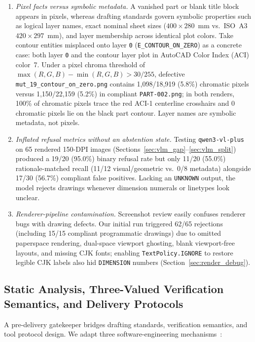 \documentclass[nocopyright,nolists,upint,varvw,hyphenate]{asmejour}
\begin{document}
\begin{enumerate}
\item \emph{Pixel facts versus symbolic metadata.} A vanished part or blank title block appears in pixels, whereas drafting standards govern symbolic properties such as logical layer names, exact nominal sheet sizes ($400 \times 280$~mm vs.\ ISO~A3 $420 \times 297$~mm), and layer membership across identical plot colors. Take contour entities misplaced onto layer \texttt{0} (\texttt{E\_CONTOUR\_ON\_ZERO}) as a concrete case: both layer \texttt{0} and the contour layer plot in AutoCAD Color Index (ACI) color~7. Under a pixel chroma threshold of $\max(R,G,B) - \min(R,G,B) > 30/255$, defective \texttt{mut\_19\_contour\_on\_zero.png} contains 1,098/18,919 (5.8\%) chromatic pixels versus 1,150/22,159 (5.2\%) in compliant \texttt{PART-002.png}; in both renders, 100\% of chromatic pixels trace the red ACI-1 centerline crosshairs and 0 chromatic pixels lie on the black part contour. Layer names are symbolic metadata, not pixels.

\item \emph{Inflated refusal metrics without an abstention state.} Testing \texttt{qwen3-vl-plus} on 65 rendered 150-DPI images (Sections~\ref{sec:vlm_gap}--\ref{sec:vlm_split}) produced a 19/20 (95.0\%) binary refusal rate but only 11/20 (55.0\%) rationale-matched recall (11/12 visual/geometric vs.\ 0/8 metadata) alongside 17/30 (56.7\%) compliant false positives. Lacking an \texttt{UNKNOWN} output, the model rejects drawings whenever dimension numerals or linetypes look unclear.

\item \emph{Renderer-pipeline contamination.} Screenshot review easily confuses renderer bugs with drawing defects. Our initial run triggered 62/65 rejections (including 15/15 compliant programmatic drawings) due to omitted paperspace rendering, dual-space viewport ghosting, blank viewport-free layouts, and missing CJK fonts; enabling \texttt{TextPolicy.IGNORE} to restore legible CJK labels also hid \texttt{DIMENSION} numbers (Section~\ref{sec:render_debug}).
\end{enumerate}

\subsection{Static Analysis, Three-Valued Verification Semantics, and Delivery Protocols}

A pre-delivery gatekeeper bridges drafting standards, verification semantics, and tool protocol design. We adapt three software-engineering mechanisms~\cite{sagiv2002parametric,sadowski2018lessons,gray2006consensus}:
\end{document}
